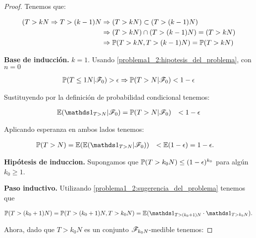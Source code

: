 \begin{proof}
	Tenemos que: 
	
	\begin{align}
		(T>kN \Rightarrow T>(k-1)N 	&\Rightarrow (T>kN) \subset (T>(k-1)N) \\ 
									&\Rightarrow (T>kN) \cap (T>(k-1)N) = (T>kN) \\ 
									&\Rightarrow \mathbb{P}(T>kN, T>(k-1)N) = \mathbb{P}(T>kN)	
	\end{align}\par\null
		
	\textbf{Base de inducción.} $k=1$. Usando \eqref{problema1_2:hipotesis_del_problema}, con $n=0$ 
	
    \begin{align}
		\mathbb{P}(T\leq 1N | \mathscr{F}_0) > \epsilon\Rightarrow
		\mathbb{P}(T>N| \mathscr{F}_0) < 1 - \epsilon
	\end{align}\par\null
    
	Sustituyendo por la definición de probabilidad condicional tenemos:

    \begin{align}
        \E(\indic_{T>N} | \F_0)	&= \mw(T>N| \F_0) 
                                &< 1 - \epsilon
    \end{align}\par\null

	Aplicando esperanza en ambos lados tenemos:
    
    \begin{align} 
        \mw(T>N) 	&= 	\E(\E(\indic_{T>N} | \F_0)) 
                    &< 	\E(1 - \epsilon) 
                    &= 1 - \epsilon.
    \end{align}\par\null
	
	\textbf{Hipótesis de induccion.} 
    Supongamos que $\mathbb{P}(T>k_0N)\leq(1 - \epsilon)^{k_0}$ para algún $k_0 \geq 1$.\par\null
	
	\textbf{Paso inductivo.} 
	Utilizando \eqref{problema1_2:sugerencia_del_problema} tenemos que
    
    \begin{align}
        \mw(T>(k_0+1)N) = \mw(T>(k_0+1)N, T>k_0N) = \E(\indic_{T>(k_0+1)N} \cdot \indic_{T>k_0N}).
    \end{align}\par\null
        
	Ahora, dado que $T>k_0N$ es un conjunto $\mathscr{F}_{k_0N}$-medible tenemos:
    

\end{proof}
